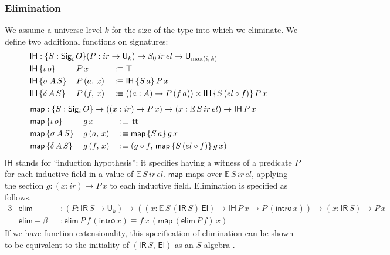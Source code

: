 \documentclass[acmsmall,screen,review,anonymous]{acmart}
\newcommand{\msf}[1]{{\mathsf{#1}}}
\newcommand{\mbb}[1]{\mathbb{#1}}
\newcommand{\U}{\msf{U}}
\newcommand{\El}{\msf{El}}
\newcommand{\Sig}{\msf{Sig}}
\newcommand{\ttt}{\msf{tt}}
\newcommand{\ir}{{ir}}
\newcommand{\el}{{el}}
\newcommand{\IR}{\msf{IR}}
\newcommand{\intro}{\msf{intro}}
\newcommand{\IH}{\msf{IH}}
\newcommand{\map}{\msf{map}}
\newcommand{\elim}{\msf{elim}}
\newcommand{\E}{\mbb{E}}
\begin{document}
\subsubsection{Elimination}\label{sec:ir-elimination}

We assume a universe level $k$ for the size of the type into which we eliminate. We define two
additional functions on signatures:
\begin{alignat*}{3}
  &\rlap{$\IH : \{S : \Sig_i\,O\}(P : \ir \to \U_k) \to S_0\,\ir\,\el \to \U_{\max(i,\,k)}$} \\
  &\IH\,\{\iota\,o\}    \,&&P\,x       &&:\equiv \top \\
  &\IH\,\{\sigma\,A\,S\}\,&&P\,(a,\,x) &&:\equiv \IH\,\{S\,a\}\,P\,x\\
  &\IH\,\{\delta\,A\,S\}\,&&P\,(f,\,x) &&:\equiv ((a : A) \to P\,(f\,a)) \times \IH\,\{S\,(\el \circ f)\}\,P\,x
\end{alignat*}
\begin{alignat*}{3}
  &\hspace{-4.8em}\rlap{$\map : \{S : \Sig_i\,O\} \to ((x : \ir) \to P\,x) \to (x : \E\,S\,\ir\,\el) \to \IH\,P\,x$} \\
  &\hspace{-4.8em}\map\,\{\iota\,o\}    \,&&g\,x       &&:\equiv\,\ttt \\
  &\hspace{-4.8em}\map\,\{\sigma\,A\,S\}\,&&g\,(a,\,x) &&:\equiv \map\,\{S\,a\}\,g\,x\\
  &\hspace{-4.8em}\map\,\{\delta\,A\,S\}\,&&g\,(f,\,x) &&:\equiv (g \circ f,\,\map\,\{S\,(\el \circ f)\}\,g\,x)
\end{alignat*}
$\IH$ stands for ``induction hypothesis'': it specifies having a witness of a predicate $P$ for
each inductive field in a value of $\E\,S\,\ir\,\el$. $\map$ maps over $\E\,S\,\ir\,\el$, applying the
section $g : (x : \ir) \to P\,x$ to each inductive field. Elimination is specified as follows.
\begin{alignat*}{3}
  &\elim           &&: (P : \IR\,S \to \U_k) \to ((x : \E\,S\,(\IR\,S)\,\El) \to \IH\,P\,x \to P\,(\intro\,x)) \to (x : \IR\,S) \to P\,x \\
  &\elim\!-\!\!\beta &&: \elim\,P\,f\,(\intro\,x) \equiv f\,x\,(\map\,(\elim\,P\,f)\,x)
\end{alignat*}
If we have function extensionality, this specification of elimination can be shown to be equivalent
to the initiality of $(\IR\,S,\,\El)$ as an $S$-algebra \cite[Section~4.4]{DBLP:journals/apal/DybjerS03}.
\end{document}
